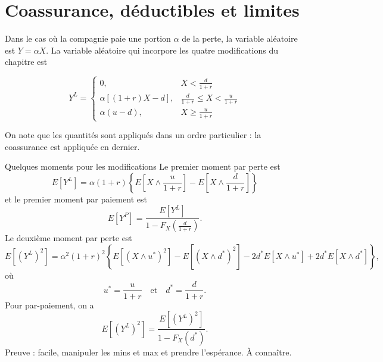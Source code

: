 \section{Coassurance, déductibles et limites}

Dans le cas où la compagnie paie une portion $\alpha$ de la perte, la variable aléatoire est $Y = \alpha X$. La variable aléatoire qui incorpore les quatre modifications du chapitre est 

$$Y^L = \begin{cases}
0,& X< \frac{d}{1 + r}\\
\alpha \left[(1 + r)X - d\right],& \frac{d}{1 + r} \leq X < \frac{u}{1 + r}\\
\alpha(u-d), & X\geq \frac{u}{1 + r}
\end{cases}$$

On note que les quantités sont appliqués dans un ordre particulier : la coassurance est appliquée en dernier. 

\begin{theoreme}{Quelques moments pour les modifications}{}
Le premier moment par perte est
$$E\left[Y^L\right] = \alpha(1 + r)\left\{ E\left[X \wedge \frac{u}{1 + r}\right] - E\left[X \wedge \frac{d}{1 + r}\right]\right\}$$
et le premier moment par paiement est
$$E\left[Y^P\right] = \frac{E\left[Y^L\right]}{1 - F_{X}\left(\frac{d}{1 + r}\right)}.$$
\tcblower
Le deuxième moment par perte est
$$E\left[\left(Y^L\right)^2\right] = \alpha^2 (1 + r)^2 \left\{ E\left[(X \wedge u^*)^2\right]-E\left[(X \wedge d^*)^2\right] -2d^*E\left[X \wedge u^*\right] + 2d^*E\left[X \wedge d^*\right]\right\},$$
où $$u^* = \frac{u}{1 + r} \quad \text{et}\quad d^* = \frac{d}{1 + r}.$$
Pour par-paiement, on a 
$$E\left[\left(Y^L\right)^2\right] = \frac{E\left[\left(Y^L\right)^2\right]}{1 - F_{X}\left(d^*\right)}.$$
Preuve : facile, manipuler les mins et max et prendre l'espérance. À connaître. 
\end{theoreme}
